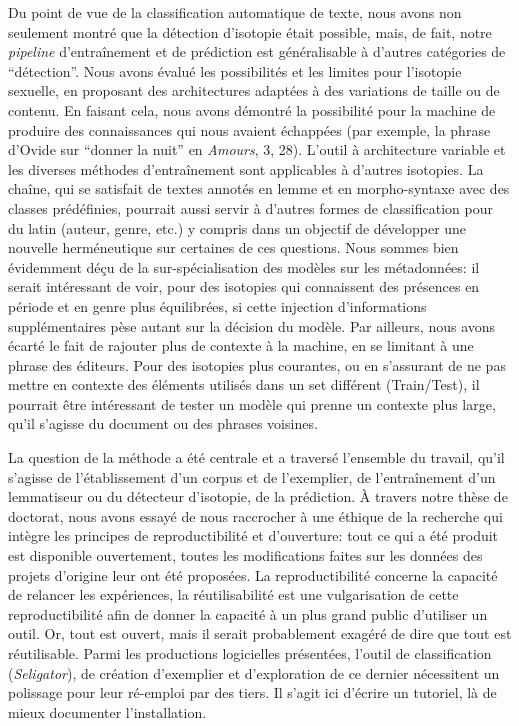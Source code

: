 Du point de vue de la classification automatique de texte, nous avons non seulement montré que la détection d'isotopie était possible, mais, de fait, notre \textit{pipeline} d'entraînement et de prédiction est généralisable à d'autres catégories de \enquote{détection}. Nous avons évalué les possibilités et les limites pour l'isotopie sexuelle, en proposant des architectures adaptées à des variations de taille ou de contenu. En faisant cela, nous avons démontré la possibilité pour la machine de produire des connaissances qui nous avaient échappées (par exemple, la phrase d'Ovide sur \enquote{donner la nuit} en \textit{Amours}, 3, 28). L'outil à architecture variable et les diverses méthodes d'entraînement sont applicables à d'autres isotopies. La chaîne, qui se satisfait de textes annotés en lemme et en morpho-syntaxe avec des classes prédéfinies, pourrait aussi servir à d'autres formes de classification pour du latin (auteur, genre, etc.) y compris dans un objectif de développer une nouvelle herméneutique sur certaines de ces questions. Nous sommes bien évidemment déçu de la sur-spécialisation des modèles sur les métadonnées: il serait intéressant de voir, pour des isotopies qui connaissent des présences en période et en genre plus équilibrées, si cette injection d'informations supplémentaires pèse autant sur la décision du modèle. Par ailleurs, nous avons écarté le fait de rajouter plus de contexte à la machine, en se limitant à une phrase des éditeurs. Pour des isotopies plus courantes, ou en s'assurant de ne pas mettre en contexte des éléments utilisés dans un set différent (Train/Test), il pourrait être intéressant de tester un modèle qui prenne un contexte plus large, qu'il s'agisse du document ou des phrases voisines.

La question de la méthode a été centrale et a traversé l'ensemble du travail, qu'il s'agisse de l'établissement d'un corpus et de l'exemplier, de l'entraînement d'un lemmatiseur ou du détecteur d'isotopie, de la prédiction. À travers notre thèse de doctorat, nous avons essayé de nous raccrocher à une éthique de la recherche qui intègre les principes de reproductibilité et d'ouverture: tout ce qui a été produit est disponible ouvertement, toutes les modifications faites sur les données des projets d'origine leur ont été proposées. La reproductibilité concerne la capacité de relancer les expériences, la réutilisabilité est une vulgarisation de cette reproductibilité afin de donner la capacité à un plus grand public d'utiliser un outil. Or, tout est ouvert, mais il serait probablement exagéré de dire que tout est réutilisable. Parmi les productions logicielles présentées, l'outil de classification (\textit{Seligator}), de création d'exemplier et d'exploration de ce dernier nécessitent un polissage pour leur ré-emploi par des tiers. Il s'agit ici d'écrire un tutoriel, là de mieux documenter l'installation. 


